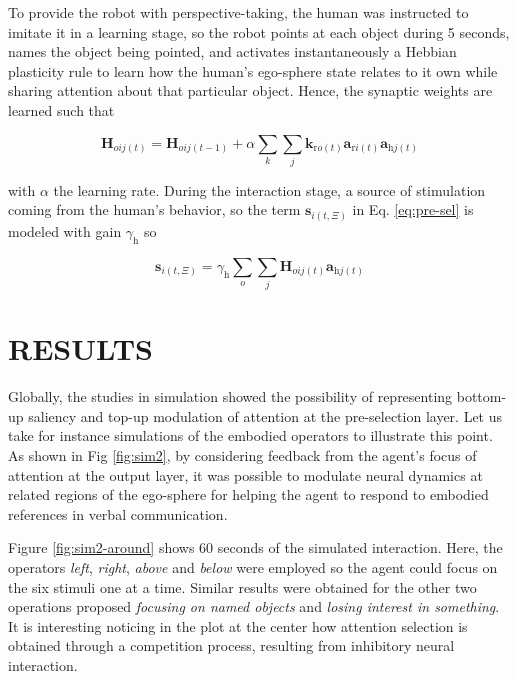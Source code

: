 \documentclass[letterpaper, 10 pt, conference]{ieeeconf}  %
\begin{document}
	To provide the robot with perspective-taking, the human was instructed to imitate it in a learning stage, so the robot points at each object during 5 seconds, names the object being pointed, and activates instantaneously a Hebbian plasticity rule to learn how the human's ego-sphere state relates to it own while sharing attention about that particular object. Hence, the synaptic weights are learned such that
	
	\begin{equation}
	\mathbf{H}_{oij(t)} = \mathbf{H}_{oij(t-1)} + \alpha \sum_{k}\sum_{j}\mathbf{k}_{\mathrm{r}o(t)}\mathbf{a}_{\mathrm{r}i(t)}\mathbf{a}_{\mathrm{h}j(t)}
	\label{eq:hebb_rule}
	\end{equation}	
	
	\noindent with $\alpha$ the learning rate. During the interaction stage, a source of stimulation coming from the human's behavior, so the term $\mathbf{s}_{i(t,\Xi)}$ in Eq. \eqref{eq:pre-sel} is modeled with gain $\gamma_{\mathrm{h}}$ so
	
	\begin{equation}
	\mathbf{s}_{i(t,\Xi)} = \gamma_{\mathrm{h}}\sum_{o}\sum_{j}\mathbf{H}_{oij(t)}\mathbf{a}_{\mathrm{h}j(t)}
	\label{eq:hebb_stim}
	\end{equation}	
	
%		
	\section{RESULTS}
	\label{sec:results}
	
	Globally, the studies in simulation showed the possibility of representing bottom-up saliency and top-up modulation of attention at the pre-selection layer. Let us take for instance simulations of the embodied operators to illustrate this point. As shown in Fig \ref{fig:sim2}, by considering feedback from the agent's focus of attention at the output layer, it was possible to modulate neural dynamics at related regions of the ego-sphere for helping the agent to respond to embodied references in verbal communication.  
	
	Figure \ref{fig:sim2-around} shows 60 seconds of the simulated interaction. Here, the operators \textit{left}, \textit{right}, \textit{above} and \textit{below} were employed so the agent could focus on the six stimuli one at a time. Similar results were obtained for the other two operations proposed \textit{focusing on named objects} and \textit{losing interest in something}. It is interesting noticing in the plot at the center how attention selection is obtained through a competition process, resulting from inhibitory neural interaction. 
\end{document}
